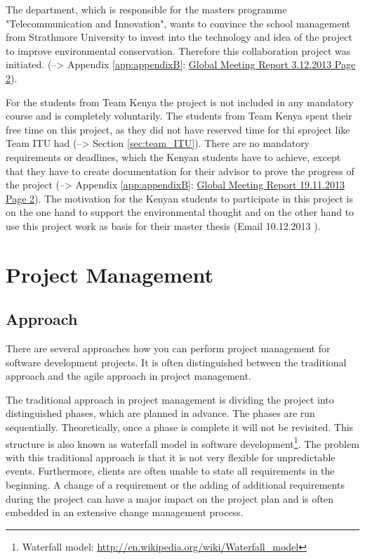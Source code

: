 The department, which is responsible for the masters programme "Telecommunication and Innovation", wants to convince the school management from Strathmore University to invest into the technology and idea of the project to improve environmental conservation. Therefore this collaboration project was initiated. (--> Appendix \ref{app:appendixB}: \hyperlink{GSD20131203.2}{Global Meeting Report 3.12.2013 Page 2}).

For the students from Team Kenya the project is not included in any mandatory course and is completely voluntarily. The students from Team Kenya spent their free time on this project, as they did not have reserved time for thi sproject like Team ITU had (--> Section \ref{sec:team_ITU}). There are no mandatory requirements or deadlines, which the Kenyan students have to achieve, except that they have to create documentation for their advisor to prove the progress of the project (--> Appendix \ref{app:appendixB}: \hyperlink{GSD20131119.2}{Global Meeting Report 19.11.2013 Page 2}). The motivation for the Kenyan students to participate in this project is on the one hand to support the environmental thought and on the other hand to use this project work as basis for their master thesis (Email 10.12.2013 ).



\section{Project Management}
\label{sec:project_management}


\subsection{Approach}
\label{sec:approach}
There are several approaches how you can perform project management for software development projects. It is often distinguished between the traditional approach and the agile approach in project management.

The traditional approach in project management is dividing the project into distinguished phases, which are planned in advance. The phases are run sequentially. Theoretically, once a phase is complete it will not be revisited. This structure is also known as waterfall model in software development\footnote{Waterfall model: \url{http://en.wikipedia.org/wiki/Waterfall_model}}.
The problem with this traditional approach is that it is not very flexible for unpredictable events. Furthermore, clients are often unable to state all requirements in the beginning. A change of a requirement or the adding of additional requirements during the project can have a major impact on the project plan and is often embedded in an extensive change management process.

